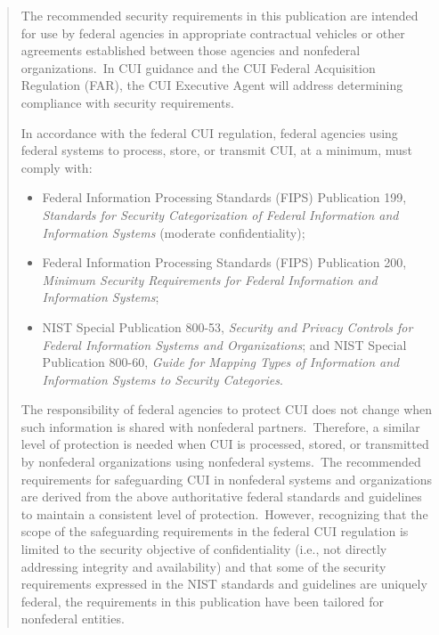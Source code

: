 \begin{formal}
\begin{quote}
The recommended security requirements in this publication are intended for use by federal agencies in appropriate contractual vehicles or other agreements established between those agencies and nonfederal organizations.\ In CUI guidance and the CUI Federal Acquisition Regulation (FAR), the CUI Executive Agent will address determining compliance with security requirements.
\vspace{10pt}

In accordance with the federal CUI regulation, federal agencies using federal systems to process, store, or transmit CUI, at a minimum, must comply with:
\vspace{10pt}

\begin{itemize}
\item Federal Information Processing Standards (FIPS) Publication 199, \textit{Standards for Security Categorization of Federal Information and Information Systems} (moderate confidentiality); 
\item Federal Information Processing Standards (FIPS) Publication 200, \textit{Minimum Security Requirements for Federal Information and Information Systems};
\item NIST Special Publication 800-53, \textit{Security and Privacy Controls for Federal Information Systems and Organizations}; and
NIST Special Publication 800-60, \textit{Guide for Mapping Types of Information and Information Systems to Security Categories}.
\end{itemize}
\vspace{10pt}

The responsibility of federal agencies to protect CUI does not change when such information is shared with nonfederal partners.\ Therefore, a similar level of protection is needed when CUI is processed, stored, or transmitted by nonfederal organizations using nonfederal systems.\ The recommended requirements for safeguarding CUI in nonfederal systems and organizations are derived from the above authoritative federal standards and guidelines to maintain a consistent level of protection.\ However, recognizing that the scope of the safeguarding requirements in the federal CUI regulation is limited to the security objective of confidentiality (i.e., not directly addressing integrity and availability) and that some of the security requirements expressed in the NIST standards and guidelines are uniquely federal, the requirements in this publication have been tailored for nonfederal entities.
\vspace{10pt}


\end{quote}
\end{formal}
